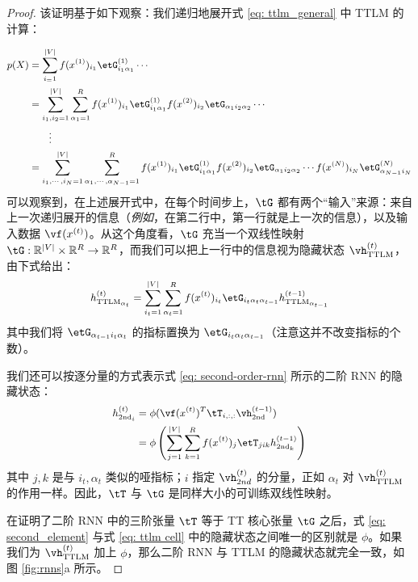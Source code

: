 \documentclass{article}
\theoremstyle{plain}
\theoremstyle{definition}
\theoremstyle{remark}
\begin{document}
\begin{proof} 该证明基于如下观察：我们递归地展开式 \ref{eq: ttlm_general} 中 TTLM 的计算：

\begin{equation} \small
\begin{aligned}
\label{eq: TTLM_unfold}
p(X) &= \sum_{{i_ = 1}}^{|V|} f(x^{(1)})_{i_1}\etG^{(1)}_{i_1\alpha_{1}}  \cdots \\
&= \sum_{{i_1,i_2 = 1}}^{|V|} \sum_{\alpha_1 = 1}^R   f(x^{(1)})_{i_1}\etG^{(1)}_{i_1\alpha_{1}} f(x^{(2)})_{i_2} \etG_{\alpha_{1}i_2\alpha_{2}} \cdots  \\
&  \quad\quad\vdots \\
&= \sum_{i_1, \cdots, i_N = 1}^{|V|}
    \sum_{\alpha_1, \cdots ,\alpha_{N-1} =1}^{R}  f(x^{(1)})_{i_1}\etG^{(1)}_{i_1\alpha_1}
    f(x^{(2)})_{i_2}\etG_{\alpha_1i_2\alpha_2} \cdots f(x^{(N)})_{i_N}\etG^{(N)}_{\alpha_{N-1}i_N}   \\
\end{aligned}
\end{equation}
%
可以观察到，在上述展开式中，在每个时间步上，$\tG$ 都有两个``输入''来源：来自上一次递归展开的信息（\textit{例如}，在第二行中，第一行就是上一次的信息），以及输入数据 $\vf(x^{(t)})$。从这个角度看，$\tG$ 充当一个双线性映射 $\tG: \mathbb{R}^{|V|} \times \mathbb{R}^R \rightarrow \mathbb{R}^R $，而我们可以把上一行中的信息视为隐藏状态 $\vh^{(t)}_\text{TTLM}$，由下式给出：
%
\begin{equation} \small
\begin{split}
    \label{eq: ttlm cell}
    h^{(t)}_{\textrm{TTLM}_{\alpha_{t}}}
    & = \sum_{{i_t = 1}}^{|V|} \sum_{{\alpha_t = 1}}^{R} f(x^{(t)})_{i_t}\etG_{i_t\alpha_{t}\alpha_{t-1}}  h^{(t-1)}_{\textrm{TTLM}_{\alpha_{t-1}}} \\
\end{split}
\end{equation}
%
其中我们将 $\etG_{\alpha_{t-1}i_t\alpha_{t}}$ 的指标置换为 $\etG_{i_t\alpha_{t}\alpha_{t-1}}$（注意这并不改变指标的个数）。

我们还可以按逐分量的方式表示式 \ref{eq: second-order-rnn} 所示的二阶 RNN 的隐藏状态：
%
\begin{equation} \small
\begin{split}
    \label{eq: second_element}
    h^{(t)}_{\textrm{2nd}_i}
    &= \phi(\vf(x^{(t)})^T \tT_{i, :, :}\vh^{(t-1)}_\textrm{2nd}) \\
    &= \phi\left(\sum^{|V|}_{j=1}\sum^{R}_{k=1} f(x^{(t)})_j\etT_{jik} h^{(t-1)}_{\textrm{2nd}_{k}}\right) \\
\end{split}
\end{equation}
%
其中 $j,k$ 是与 $i_t, \alpha_{t}$ 类似的哑指标；$i$ 指定 $\vh^{(t)}_{2nd}$ 的分量，正如 $\alpha_t$ 对 $\vh^{(t)}_\text{TTLM}$ 的作用一样。因此，$\tT$ 与 $\tG$ 是同样大小的可训练双线性映射。

在证明了二阶 RNN 中的三阶张量 $\tT$ 等于 TT 核心张量 $\tG$ 之后，式 \ref{eq: second_element} 与式 \ref{eq: ttlm cell} 中的隐藏状态之间唯一的区别就是 $\phi$。如果我们为 $\vh^{(t)}_\text{TTLM}$ 加上 $\phi$，那么二阶 RNN 与 TTLM 的隐藏状态就完全一致，如图 \ref{fig:rnns}a 所示。


\end{proof}
\end{document}
